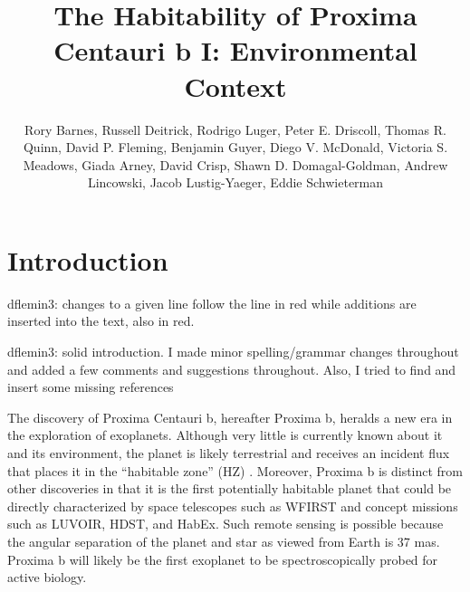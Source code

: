 \documentclass[preprint,12pt]{aastex}
\newcommand{\xxx}[1]{{\color{red} #1}} %
\newcommand{\xxx}[1]{{\color{red} #1}} %
\begin{document}
\title{The Habitability of Proxima Centauri b I: Environmental Context}
\author{Rory Barnes, Russell Deitrick, Rodrigo Luger, Peter E. Driscoll, Thomas R. Quinn, David P. Fleming, Benjamin Guyer, Diego V. McDonald, Victoria S. Meadows, Giada Arney, David Crisp, Shawn D. Domagal-Goldman, Andrew Lincowski, Jacob Lustig-Yaeger, Eddie Schwieterman}

\begin{abstract}
\end{abstract}

\section{Introduction\label{sec:intro}}

\xxx{dflemin3: changes to a given line follow the line in red while additions are inserted into the text, also in red.}

\xxx{dflemin3: solid introduction.  I made minor spelling/grammar changes throughout and added a few comments
and suggestions throughout.  Also, I tried to find and insert some missing references}

The discovery of Proxima Centauri b, hereafter Proxima b, heralds a
new era in the exploration of exoplanets. Although very little is
currently known about it and its environment, the planet is likely
terrestrial and receives an incident flux that places it in the
``habitable zone'' (HZ)
\citep{Kasting93,Selsis07,Kopparapu13}. Moreover, Proxima b is
distinct from other discoveries in that it is the first potentially
habitable planet that could be directly characterized by space
telescopes such as WFIRST and concept missions such as LUVOIR, HDST,
and HabEx. Such remote sensing is possible because the angular
separation of the planet and star as viewed from Earth is
37 mas. Proxima b will likely be the first exoplanet to be
spectroscopically probed for active biology.
\end{document}
